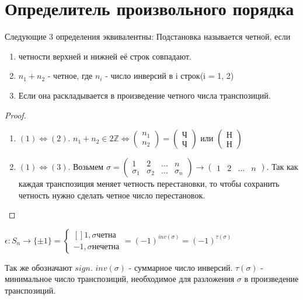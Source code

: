 \section{Определитель произвольного порядка}
\begin{proposition}
	Следующие 3 определения эквивалентны: \newline
	Подстановка называется четной, если 
	\begin{enumerate}
		\item четности верхней и нижней её строк совпадают.
		\item \(n_1+n_2\) - четное, где \(n_i\) - число инверсий в i строк(i = 1, 2)
		\item Если она раскладывается в произведение четного числа транспозиций.
	\end{enumerate}
\end{proposition}
\begin{proof}
	\begin{enumerate}
		\item \((1)\Longleftrightarrow(2)\). \(n_1+n_2\in2\mathbb{Z}\Longleftrightarrow \begin{pmatrix}
			n_1 \\ n_2
		\end{pmatrix} = \begin{pmatrix}
		\text{Ч} \\ \text{Ч}
		\end{pmatrix}\) или \(\begin{pmatrix}
		\text{Н} \\ \text{Н}
		\end{pmatrix}\)
		\item \((1)\Longleftrightarrow(3)\). Возьмем \(\sigma = \begin{pmatrix}
			1 & 2 & \ldots & n \\
			\sigma_1 & \sigma_2 & \ldots & \sigma_n
		\end{pmatrix}\longrightarrow\begin{pmatrix}
		1 & 2 & \ldots & n
		\end{pmatrix}\). Так как каждая транспозиция меняет четность перестановки, то чтобы сохранить четность нужно сделать четное число перестановок.
	\end{enumerate}
\end{proof}
\begin{definition}

	\(\epsilon:S_n\to\{\pm 1\} = \left\{\begin{gathered}[]
		1, \sigma \text{четна} \\
		-1, \sigma \text{нечетна}
	\end{gathered}\right. = (-1)^{inv(\sigma)} = (-1)^{\tau(\sigma)}\) 
	
	Так же обозначают \(sign\). \(inv(\sigma)\) - суммарное число инверсий. \(\tau(\sigma)\) - минимальное число транспозиций, необходимое для разложения $\sigma$ в произведение транспозиций.
\end{definition}
